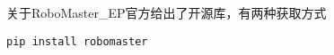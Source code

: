 
关于RoboMaster_EP官方给出了开源库，有两种获取方式
\begin{lstlisting}[language=pythonC]
pip install robomaster
\end{lstlisting}